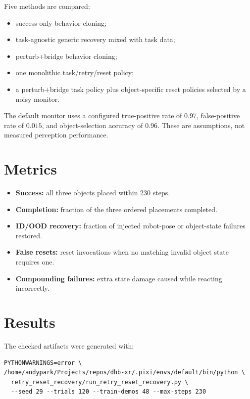\documentclass[11pt]{article}
\begin{document}
\begin{samepage}
Five methods are compared:
\begin{itemize}[leftmargin=1.7em]
  \item success-only behavior cloning;
  \item task-agnostic generic recovery mixed with task data;
  \item perturb+bridge behavior cloning;
  \item one monolithic task/retry/reset policy;
  \item a perturb+bridge task policy plus object-specific reset policies selected by a noisy monitor.
\end{itemize}
\end{samepage}
The default monitor uses a configured true-positive rate of $0.97$, false-positive rate of $0.015$, and object-selection accuracy of $0.96$. These are assumptions, not measured perception performance.

\section{Metrics}
\begin{itemize}[leftmargin=1.5em]
  \item \textbf{Success:} all three objects placed within 230 steps.
  \item \textbf{Completion:} fraction of the three ordered placements completed.
  \item \textbf{ID/OOD recovery:} fraction of injected robot-pose or object-state failures restored.
  \item \textbf{False resets:} reset invocations when no matching invalid object state requires one.
  \item \textbf{Compounding failures:} extra state damage caused while reacting incorrectly.
\end{itemize}

\section{Results}
The checked artifacts were generated with:
\begin{verbatim}
PYTHONWARNINGS=error \
/home/andypark/Projects/repos/dhb-xr/.pixi/envs/default/bin/python \
  retry_reset_recovery/run_retry_reset_recovery.py \
  --seed 29 --trials 120 --train-demos 48 --max-steps 230
\end{verbatim}
\end{document}
